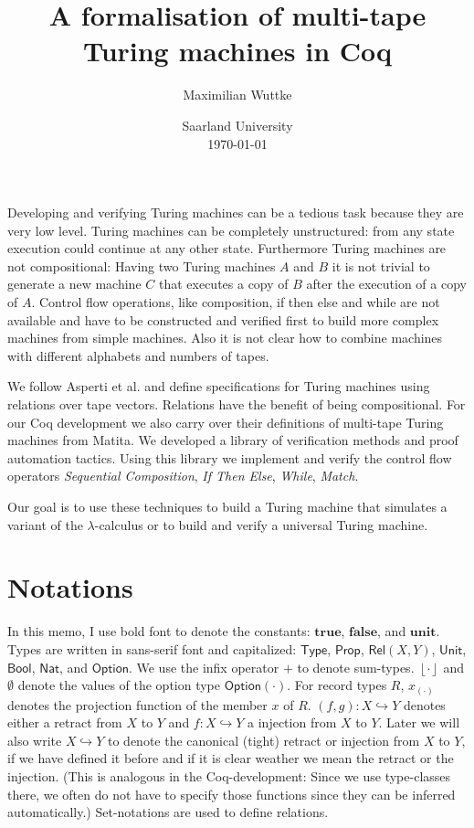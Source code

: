 \documentclass{psartcl}
\newcommand{\MS}[1]{\textsf{#1}}
\newcommand{\from}{:}
\newcommand{\Option}{\MS{Option}}
\newcommand{\Bool}{\MS{Bool}}
\newcommand{\Nat}{\MS{Nat}}
\newcommand{\Prop}{\MS{Prop}}
\newcommand{\Type}{\MS{Type}}
\newcommand{\Unit}{\MS{Unit}}
\newcommand{\Some}[1]{\left\lfloor #1\right\rfloor}
\renewcommand{\None}{\emptyset}
\newcommand{\true}{\mathbf{true}}
\newcommand{\false}{\mathbf{false}}
\newcommand{\unit}{\mathbf{unit}}
\newcommand{\Rel}{\mathsf{Rel}}
\begin{document}
\title{A formalisation of multi-tape \\ Turing machines in Coq}
\author{Maximilian Wuttke}
\date{Saarland University\\\today}
\maketitle

\begin{abstract}
  \noindent
\end{abstract}
Developing and verifying Turing machines can be a tedious task because they are very low level.  Turing machines can be completely unstructured: from
any state execution could continue at any other state.  Furthermore Turing machines are not compositional:  Having two Turing machines $A$ and $B$ it
is not trivial to generate a new machine $C$ that executes a copy of $B$ after the execution of a copy of $A$.  Control flow operations, like
composition, if then else and while are not available and have to be constructed and verified first to build more complex machines from simple
machines.  Also it is not clear how to combine machines with different alphabets and numbers of tapes.

We follow Asperti et al. and define specifications for Turing machines using relations over tape vectors.  Relations have the benefit of being
compositional.  For our Coq development we also carry over their definitions of multi-tape Turing machines from Matita.  We developed a library of
verification methods and proof automation tactics.  Using this library we implement and verify the control flow operators \emph{Sequential
Composition}, \emph{If Then Else}, \emph{While}, \emph{Match}.

Our goal is to use these techniques to build a Turing machine that simulates a variant of the $\lambda$-calculus or to build and verify a universal
Turing machine.

\section{Notations}
In this memo, I use bold font to denote the constants: $\true$, $\false$, and $\unit$.  Types are written in sans-serif font and capitalized: $\Type$,
$\Prop$, $\Rel(X, Y)$, $\Unit$, $\Bool$, $\Nat$, and $\Option$.  We use the infix operator $+$ to denote sum-types.  $\Some{\cdot}$ and $\None$ denote
the values of the option type $\Option(\cdot)$.  For record types $R$, $x_{(\cdot)}$ denotes the projection function of the member $x$ of $R$.
$(f, g) \from X \hookrightarrow Y$ denotes either a retract from $X$ to $Y$ and $f \from X \hookrightarrow Y$ a injection from $X$ to $Y$.
Later we will also write $X \hookrightarrow Y$ to denote the canonical (tight) retract or injection from $X$ to $Y$, if we have defined it before and
if it is clear weather we mean the retract or the injection.  (This is analogous in the Coq-development:  Since we use type-classes there, we often
do not have to specify those functions since they can be inferred automatically.)  Set-notations are used to define relations.
\end{document}
